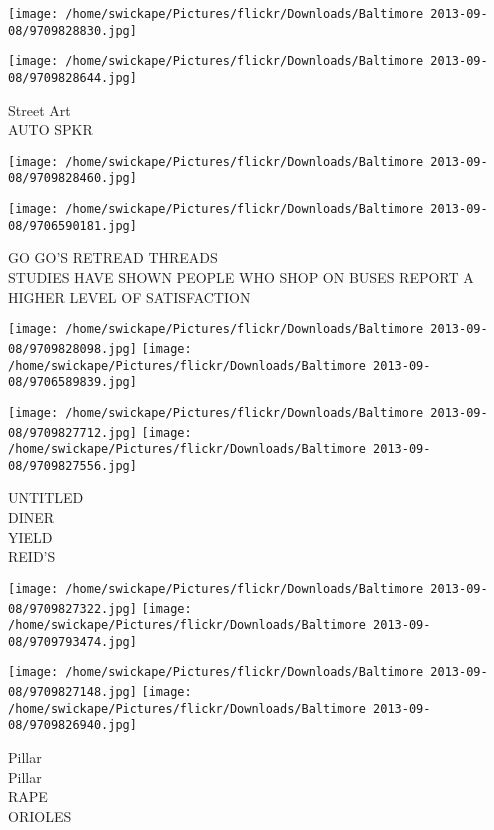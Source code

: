 \documentclass[10pt,letterpaper]{article}
\begin{document}
\texttt{[image: /home/swickape/Pictures/flickr/Downloads/Baltimore 2013-09-08/9709828830.jpg]}

\vspace{0.25in}
\texttt{[image: /home/swickape/Pictures/flickr/Downloads/Baltimore 2013-09-08/9709828644.jpg]}

Street Art\\
AUTO SPKR\\
\pagebreak

\texttt{[image: /home/swickape/Pictures/flickr/Downloads/Baltimore 2013-09-08/9709828460.jpg]}

\vspace{0.25in}
\texttt{[image: /home/swickape/Pictures/flickr/Downloads/Baltimore 2013-09-08/9706590181.jpg]}

GO GO'S RETREAD THREADS\\
STUDIES HAVE SHOWN PEOPLE WHO SHOP ON BUSES REPORT A HIGHER LEVEL OF SATISFACTION\\
\pagebreak

\texttt{[image: /home/swickape/Pictures/flickr/Downloads/Baltimore 2013-09-08/9709828098.jpg]}
\texttt{[image: /home/swickape/Pictures/flickr/Downloads/Baltimore 2013-09-08/9706589839.jpg]}

\texttt{[image: /home/swickape/Pictures/flickr/Downloads/Baltimore 2013-09-08/9709827712.jpg]}
\texttt{[image: /home/swickape/Pictures/flickr/Downloads/Baltimore 2013-09-08/9709827556.jpg]}

UNTITLED\\
DINER\\
YIELD\\
REID'S\\
\pagebreak

\texttt{[image: /home/swickape/Pictures/flickr/Downloads/Baltimore 2013-09-08/9709827322.jpg]}
\texttt{[image: /home/swickape/Pictures/flickr/Downloads/Baltimore 2013-09-08/9709793474.jpg]}

\texttt{[image: /home/swickape/Pictures/flickr/Downloads/Baltimore 2013-09-08/9709827148.jpg]}
\texttt{[image: /home/swickape/Pictures/flickr/Downloads/Baltimore 2013-09-08/9709826940.jpg]}

Pillar\\
Pillar\\
RAPE\\
ORIOLES\\
\pagebreak
\end{document}
